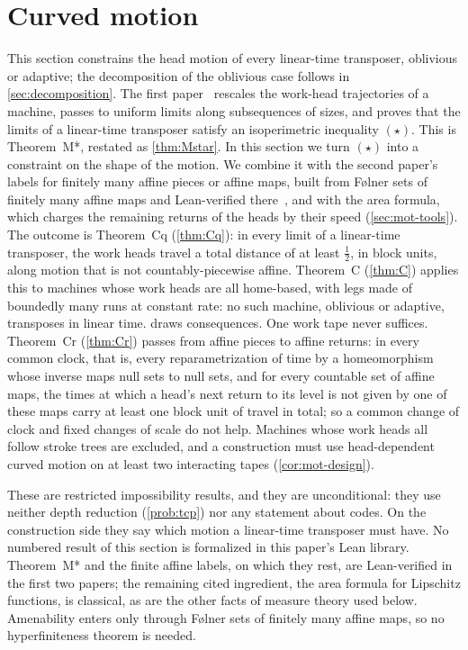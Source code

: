 \section{Curved motion}\label{sec:motion}

This section constrains the head motion of every linear-time transposer, oblivious or adaptive; the decomposition of
the oblivious case follows in \cref{sec:decomposition}. The first paper~\cite{FirstPaper2026} rescales the work-head trajectories of a machine, passes to uniform limits
along subsequences of sizes, and proves that the limits of a linear-time transposer satisfy an isoperimetric
inequality $(\star)$. This is Theorem~M*, restated as \cref{thm:Mstar}. In this section we turn $(\star)$ into a
constraint on the shape of the motion. We combine it with the second paper's labels for finitely many affine pieces or
affine maps, built from F\o lner sets of finitely many affine maps and Lean-verified there~\cite{SecondPaper2026}, and
with the area formula, which charges the remaining returns of the heads by their speed (\cref{sec:mot-tools}). The outcome is Theorem~Cq (\cref{thm:Cq}): in every limit of a linear-time transposer, the work heads travel a total
distance of at least $\frac12$, in block units, along motion that is not countably-piecewise affine. Theorem~C
(\cref{thm:C}) applies this to machines whose work heads are all home-based, with legs made of boundedly many runs at
constant rate: no such machine, oblivious or adaptive, transposes in linear time.
 draws consequences. One work tape never suffices. Theorem~Cr (\cref{thm:Cr}) passes from
affine pieces to affine returns: in every common clock, that is, every reparametrization of time by a homeomorphism
whose inverse maps null sets to null sets, and for every countable set of affine maps, the times at which a head's next
return to its level is not given by one of these maps carry at least one block unit of travel in total; so a common
change of clock and fixed changes of scale do not help. Machines whose work heads all follow stroke trees are excluded, and a construction
must use head-dependent curved motion on at least two interacting tapes (\cref{cor:mot-design}).

These are restricted impossibility results, and they are unconditional: they use neither depth reduction
(\cref{prob:tcp}) nor any statement about codes. On the construction side they say which motion a linear-time
transposer must have. No numbered result of this section is formalized in this paper's Lean library. Theorem~M* and the finite affine
labels, on which they rest, are Lean-verified in the first two papers; the remaining cited ingredient, the area formula
for Lipschitz functions, is classical, as are the other facts of measure theory used below. Amenability enters only
through F\o lner sets of finitely many affine maps, so no hyperfiniteness theorem is needed.

